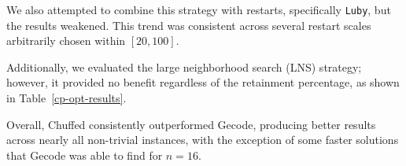\documentclass{article}
\begin{document}
We also attempted to combine this strategy with restarts, specifically \texttt{Luby}, but the results weakened. This trend was consistent across several restart scales arbitrarily chosen within $[20,100]$.

Additionally, we evaluated the large neighborhood search (LNS) strategy; however, it provided no benefit regardless of the retainment percentage, as shown in Table~\ref{cp-opt-results}.

Overall, Chuffed consistently outperformed Gecode, producing better results across nearly all non-trivial instances, with the exception of some faster solutions that Gecode was able to find for $n=16$. 

\begin{table}[h!]
\centering
{}
\caption{Optimization version: runtime in seconds and found objective value for different combinations of models, solvers and search strategies.}
\label{cp-opt-results}
\end{table}
\end{document}
